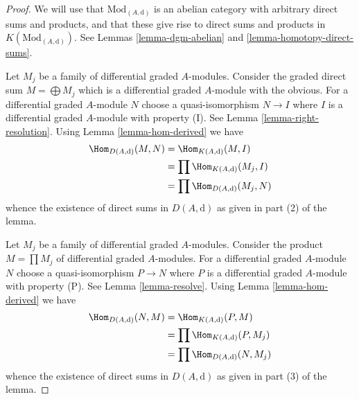 \begin{proof}
We will use that $\text{Mod}_{(A, \text{d})}$ is an abelian category
with arbitrary direct sums and products, and that these give rise
to direct sums and products in $K(\text{Mod}_{(A, \text{d})})$.
See Lemmas \ref{lemma-dgm-abelian} and \ref{lemma-homotopy-direct-sums}.

\medskip\noindent
Let $M_j$ be a family of differential graded $A$-modules.
Consider the graded direct sum $M = \bigoplus M_j$ which is a
differential graded $A$-module with the obvious.
For a differential graded $A$-module $N$ choose a quasi-isomorphism
$N \to I$ where $I$ is a differential graded $A$-module with property (I).
See Lemma \ref{lemma-right-resolution}.
Using Lemma \ref{lemma-hom-derived} we have
\begin{align*}
\Hom_{D(A, \text{d})}(M, N)
& =
\Hom_{K(A, \text{d})}(M, I) \\
& =
\prod \Hom_{K(A, \text{d})}(M_j, I) \\
& =
\prod \Hom_{D(A, \text{d})}(M_j, N)
\end{align*}
whence the existence of direct sums in $D(A, \text{d})$ as given in
part (2) of the lemma.

\medskip\noindent
Let $M_j$ be a family of differential graded $A$-modules.
Consider the product $M = \prod M_j$ of differential graded $A$-modules.
For a differential graded $A$-module $N$ choose a quasi-isomorphism
$P \to N$ where $P$ is a differential graded $A$-module with property (P).
See Lemma \ref{lemma-resolve}.
Using Lemma \ref{lemma-hom-derived} we have
\begin{align*}
\Hom_{D(A, \text{d})}(N, M)
& =
\Hom_{K(A, \text{d})}(P, M) \\
& =
\prod \Hom_{K(A, \text{d})}(P, M_j) \\
& =
\prod \Hom_{D(A, \text{d})}(N, M_j)
\end{align*}
whence the existence of direct sums in $D(A, \text{d})$ as given in
part (3) of the lemma.
\end{proof}

